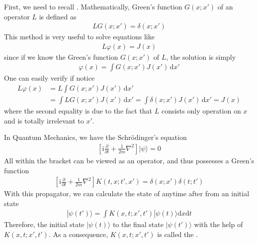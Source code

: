 \documentclass[letterpaper,10pt,english]{sphinxmanual}
\begin{document}
First, we need to recall . Mathematically, Green's function \(G(x;x')\) of an operator \(L\) is defined as
\begin{equation*}
\begin{split}LG(x;x') = \delta(x;x')\end{split}
\end{equation*}
This method is very useful to solve equations like
\begin{equation*}
\begin{split}L\varphi(x) = J(x)\end{split}
\end{equation*}
since if we know the Green's function \(G(x;x')\) of \(L\), the solution is simply
\begin{equation*}
\begin{split}\varphi(x) = \int G(x;x') J(x')\,\mathrm{d}x'\end{split}
\end{equation*}
One can easily verify if notice
\begin{equation*}
\begin{split}L\varphi(x) &= L\int G(x;x') J(x')\,\mathrm{d}x' \\
&= \int LG(x;x') J(x')\,\mathrm{d}x' = \int \delta(x;x') J(x')\,\mathrm{d}x' = J(x)\end{split}
\end{equation*}
where the second equality is due to the fact that \(L\) consists only operation on \(x\) and is totally irrelevant to \(x'\).

In Quantum Mechanics, we have the Schrödinger’s equation
\begin{equation*}
\begin{split}\left[\mathrm{i}\frac{\partial}{\partial t} + \frac{1}{2m}\nabla^2\right]|\psi\rangle = 0\end{split}
\end{equation*}
All within the bracket can be viewed as an operator, and thus possesses a Green's function
\begin{equation*}
\begin{split}\left[\mathrm{i}\frac{\partial}{\partial t} + \frac{1}{2m}\nabla^2\right]K(t,x;t',x') = \delta(x;x')\delta(t;t')\end{split}
\end{equation*}
With this propagator, we can calculate the state of anytime after from an initial state
\begin{equation*}
\begin{split}|\psi(t')\rangle = \int K(x,t;x',t')|\psi(t)\rangle\mathrm{d}x\mathrm{d}t\end{split}
\end{equation*}
Therefore, the initial state \(|\psi(t)\rangle\)  to the final state \(|\psi(t')\rangle\) with the help of \(K(x,t;x',t')\). As a consequence, \(K(x,t;x',t')\) is called the .
\end{document}
